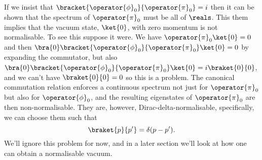 \documentclass[fleqn]{NotesClass}
\begin{document}
    If we insist that \(\bracket{\operator{\phi}_0}{\operator{\pi}_0} = i\) then it can be shown that the spectrum of \(\operator{\pi}_0\) must be all of \(\reals\).
    This them implies that the vacuum state, \(\ket{0}\), with zero momentum is not normalisable.
    To see this suppose it were.
    We have \(\operator{\pi}_0\ket{0} = 0\) and then \(\bra{0} \bracket{\operator{\phi}_0}{\operator{\pi}_0}\ket{0} = 0\) by expanding the commutator, but also \(\bra{0}\bracket{\operator{\phi}_0}{\operator{\pi}_0}\ket{0} = i\braket{0}{0}\), and we can't have \(\braket{0}{0} = 0\) so this is a problem.
    The canonical commutation relation enforces a continuous spectrum not just for \(\operator{\pi}_0\) but also for \(\operator{\phi}_0\), and the resulting eigenstates of \(\operator{\pi}_0\) are then non-normalisable.
    They are, however, Dirac-delta-normalisable, specifically, we can choose them such that
    \begin{equation}
        \braket{p}{p'} = \delta(p - p').
    \end{equation}
    We'll ignore this problem for now, and in a later section we'll look at how one can obtain a normalisable vacuum.
    
\end{document}
